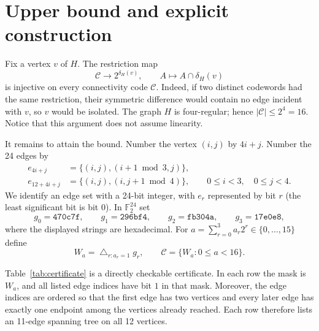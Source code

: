 \documentclass[11pt]{article}
\newcommand{\F}{\mathbb F}
\newcommand{\cC}{\mathcal C}
\newcommand{\bits}[1]{\ensuremath{\mathtt{#1}}}
\begin{document}
\section{Upper bound and explicit construction}

Fix a vertex $v$ of $H$.  The restriction map
\[
  \cC\longrightarrow 2^{\delta_H(v)},\qquad
  A\longmapsto A\cap\delta_H(v)
\]
is injective on every connectivity code $\cC$.  Indeed, if two distinct
codewords had the same restriction, their symmetric difference would
contain no edge incident with $v$, so $v$ would be isolated.  The graph
$H$ is four-regular; hence $|\cC|\leq 2^4=16$.  Notice that this argument
does not assume linearity.

It remains to attain the bound.  Number the vertex $(i,j)$ by $4i+j$.
Number the 24 edges by
\begin{align*}
 e_{4i+j}&=\{(i,j),(i+1\bmod 3,j)\},\\
 e_{12+4i+j}&=\{(i,j),(i,j+1\bmod 4)\},
 \qquad 0\leq i<3,\quad 0\leq j<4.
\end{align*}
We identify an edge set with a 24-bit integer, with $e_r$ represented by
bit $r$ (the least significant bit is bit $0$).  In $\F_2^{24}$ set
\[
 g_0=\bits{470c7f},\qquad g_1=\bits{296bf4},\qquad
 g_2=\bits{fb304a},\qquad g_3=\bits{17e0e8},
\]
where the displayed strings are hexadecimal.  For
$a=\sum_{r=0}^3 a_r2^r\in\{0,\ldots,15\}$ define
\[
  W_a=\bigtriangleup_{r:a_r=1}g_r,
  \qquad
  \cC=\{W_a:0\leq a<16\}.
\]

Table~\ref{tab:certificate} is a directly checkable certificate.  In each
row the mask is $W_a$, and all listed edge indices have bit $1$ in that
mask.  Moreover, the edge indices are ordered so that the first edge has
two vertices and every later edge has exactly one endpoint among the
vertices already reached.  Each row therefore lists an 11-edge spanning
tree on all 12 vertices.
\end{document}
